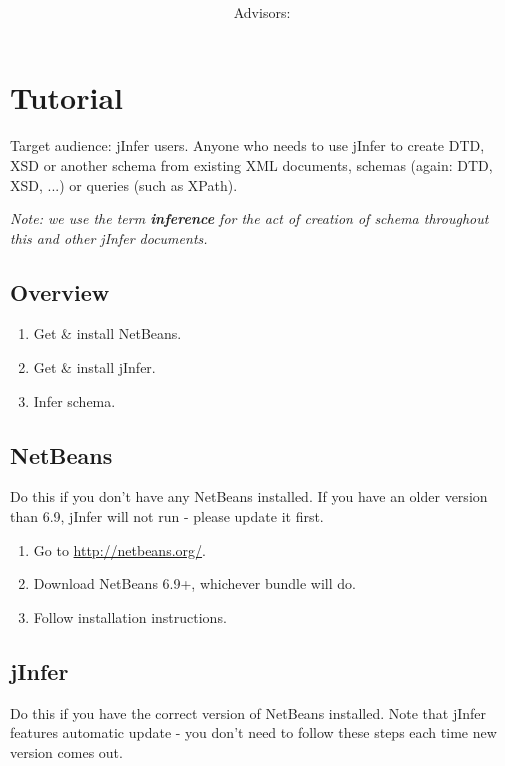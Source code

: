 \documentclass[a4paper,10pt,oneside]{article}
\title{\bf\mftitle}
\author{\mfauthor \\ Advisors: \mfadvisor}
\date{\mfplacedate}
\begin{document}
\maketitle


 \section*{Tutorial}
        \par 
          Target audience: jInfer users. Anyone who needs to use jInfer to create DTD, XSD or another schema from existing XML documents, schemas (again: DTD, XSD, ...) or queries (such as XPath).
        
        \par 
          \emph{Note: we use the term \textbf{inference} for the act of creation of schema throughout this and other jInfer documents.}
        
\subsection*{Overview}
\begin{enumerate}
  \item Get \& install NetBeans.
  \item Get \& install jInfer.
  \item Infer schema.
\end{enumerate}
\subsection*{NetBeans}
\par 
  Do this if you don't have any NetBeans installed. If you have an older version than 6.9, jInfer will not run - please update it first.

\begin{enumerate}
  \item Go to \url{http://netbeans.org/}.
  \item Download NetBeans 6.9+, whichever bundle will do.
  \item Follow installation instructions.
  
\end{enumerate}
\subsection*{jInfer}
\par 
  Do this if you have the correct version of NetBeans installed. Note that jInfer features automatic update - you don't need to follow these steps each time new version comes out.
\end{document}

